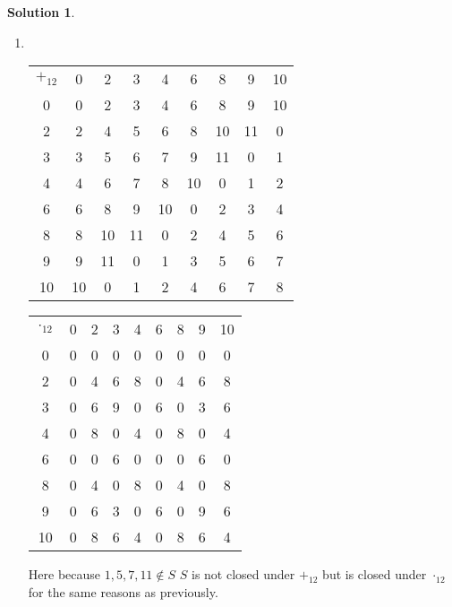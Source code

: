 \documentclass[10pt]{article}
\theoremstyle{definition}
\newtheorem{soln}{Solution}
\begin{document}
\begin{soln}
\begin{enumerate}[label=(\alph*)]
    \item ~\begin{center}
            \setlength\extrarowheight{3pt}
            \noindent\begin{tabular}{c | c c c c c c c c}
              $+_{12}$ & 0  & 2  & 3  & 4  & 6  & 8  & 9  & 10 \\
              \cline{1-9}
              0        & 0  & 2  & 3  & 4  & 6  & 8  & 9  & 10 \\
              2        & 2  & 4  & 5  & 6  & 8  & 10 & 11 & 0  \\
              3        & 3  & 5  & 6  & 7  & 9  & 11 & 0  & 1  \\
              4        & 4  & 6  & 7  & 8  & 10 & 0  & 1  & 2  \\
              6        & 6  & 8  & 9  & 10 & 0  & 2  & 3  & 4  \\
              8        & 8  & 10 & 11 & 0  & 2  & 4  & 5  & 6  \\
              9        & 9  & 11 & 0  & 1  & 3  & 5  & 6  & 7  \\
              10       & 10 & 0  & 1  & 2  & 4  & 6  & 7  & 8  \\
            \end{tabular}
            \qquad
            \noindent\begin{tabular}{c | c c c c c c c c}
              $\cdot_{12}$ & 0 & 2 & 3 & 4 & 6 & 8 & 9 & 10 \\
              \cline{1-9}
              0            & 0 & 0 & 0 & 0 & 0 & 0 & 0 & 0  \\
              2            & 0 & 4 & 6 & 8 & 0 & 4 & 6 & 8  \\
              3            & 0 & 6 & 9 & 0 & 6 & 0 & 3 & 6  \\
              4            & 0 & 8 & 0 & 4 & 0 & 8 & 0 & 4  \\
              6            & 0 & 0 & 6 & 0 & 0 & 0 & 6 & 0  \\
              8            & 0 & 4 & 0 & 8 & 0 & 4 & 0 & 8  \\
              9            & 0 & 6 & 3 & 0 & 6 & 0 & 9 & 6  \\
              10           & 0 & 8 & 6 & 4 & 0 & 8 & 6 & 4  \\
            \end{tabular}
          \end{center}
          Here because $1,5,7,11\notin S$ $S$ is not closed under $+_12$ but is closed under $\cdot_12$ for the same reasons as previously.

\end{enumerate}
\end{soln}
\end{document}
